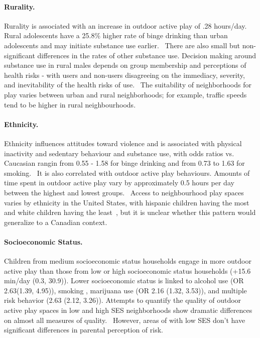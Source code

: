 \documentclass [11pt]{article}
\begin{document}
\paragraph{Rurality.} Rurality is associated with an increase in outdoor active play of .28 hours/day.  \cite{Lee2016-rb} Rural adolescents have a 25.8\% higher rate of binge drinking than urban adolescents and may initiate substance use earlier.~\cite{noauthor_undated-so} There are also small but non-significant differences in the rates of other substance use. Decision making around substance use in rural males depends on group membership and perceptions of health risks - with users and non-users disagreeing on the immediacy, severity, and inevitability of the health risks of use.~\cite{Couch2017-tb} The suitability of neighborhoods for play varies between urban and rural neighborhoods; for example, traffic speeds tend to be higher in rural neighbourhoods.~\cite{McAndrews2016-kk}

\paragraph{Ethnicity.} Ethnicity influences attitudes toward violence \cite{Galano2017-yv} and is associated with physical inactivity and sedentary behaviour\cite{Uijtdewilligen2011-km,Salmon2011-co} and substance use, with odds ratios vs. Caucasian rangin from 0.55 - 1.58 for binge drinking and from 0.73 to 1.63 for smoking.~\cite{Shih2010-yv} It is also correlated with outdoor active play behaviours. Amounts of time spent in outdoor active play vary by approximately 0.5 hours per day between the highest and lowest groups.~\cite{Lee2016-rb} Access to neighbourhood play spaces varies by ethnicity in the United States, with hispanic children having the most and white children having the least~\cite{Bottino2012-ja}, but it is unclear whether this pattern would generalize to a Canadian context. 

\paragraph{Socioeconomic Status.} Children from medium socioeconomic status households engage in more outdoor active play than those from low or high socioeconomic status households (+15.6 min/day (0.3, 30.9))\cite{Bringolf-Isler2010-ma}. Lower socioeconomic status is linked to alcohol use (OR 2.63(1.39, 4.95))\cite{Patrick2012-ed}, smoking \cite{Wellman2016-yp}, marijuana use (OR 2.16 (1.32, 3.53))\cite{Patrick2012-ed}, and multiple risk behavior (2.63 (2.12, 3.26))\cite{Filippidis2016-qo}. Attempts to quantify the quality of outdoor active play spaces in low and high SES neighborhoods show dramatic differences on almost all measures of quality.~\cite{Jenkins2015-ru} However, areas of with low SES don't have significant differences in parental perception of risk.~\cite{Moussa2013-dw}
\end{document}
